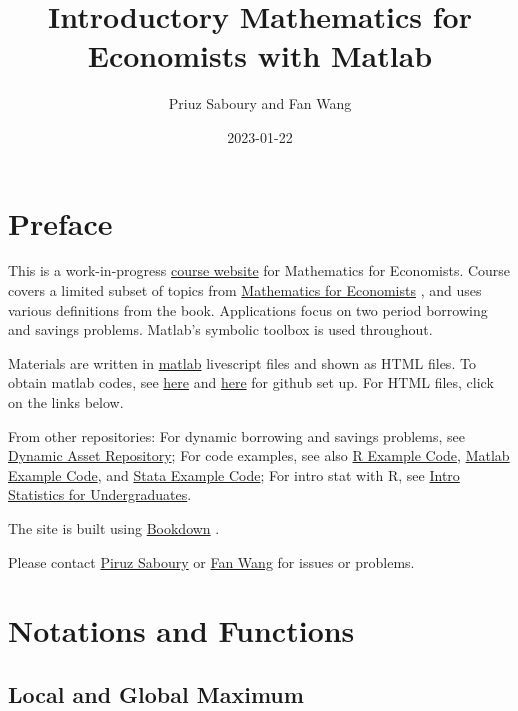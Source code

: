 \documentclass[
]{book}
\title{Introductory Mathematics for Economists with Matlab}
\author{Priuz Saboury and Fan Wang}
\date{2023-01-22}
\begin{document}
\maketitle

{
\hypersetup{linkcolor=}
\setcounter{tocdepth}{1}
\tableofcontents
}
\hypertarget{preface}{%
\chapter*{Preface}\label{preface}}

This is a work-in-progress \href{https://Math4Econ.github.io/}{course website} for Mathematics for Economists. Course covers a limited subset of topics from \href{Mathematics\%20for\%20Economists}{Mathematics for Economists} \citep{simonblume1994}, and uses various definitions from the book. Applications focus on two period borrowing and savings problems. Matlab's symbolic toolbox is used throughout.

Materials are written in \href{https://www.mathworks.com/products/matlab.html}{matlab} \citep{matlab} livescript files and shown as HTML files. To obtain matlab codes, see \href{docs/gitsetup.md}{here} and \href{docs/gitsetupown.md}{here} for github set up. For HTML files, click on the links below.

From other repositories: For dynamic borrowing and savings problems, see \href{https://fanwangecon.github.io/CodeDynaAsset/}{Dynamic Asset Repository}; For code examples, see also \href{https://fanwangecon.github.io/R4Econ/}{R Example Code}, \href{https://fanwangecon.github.io/M4Econ/}{Matlab Example Code}, and \href{https://fanwangecon.github.io/Stata4Econ/}{Stata Example Code}; For intro stat with R, see \href{https://fanwangecon.github.io/Stat4Econ/}{Intro Statistics for Undergraduates}.

The site is built using \href{https://bookdown.org/}{Bookdown} \citep{R-bookdown}.

Please contact \href{https://piruzsaboury.weebly.com/}{Piruz Saboury} or \href{https://fanwangecon.github.io/}{Fan Wang} for issues or problems.

\hypertarget{notations-and-functions}{%
\chapter{Notations and Functions}\label{notations-and-functions}}

\hypertarget{local-and-global-maximum}{%
\section{Local and Global Maximum}\label{local-and-global-maximum}}
\end{document}
